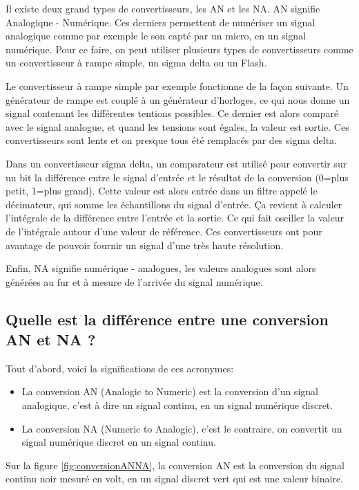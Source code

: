 \documentclass[a4paper]{article}
\begin{document}
Il existe deux grand types de convertisseurs, les AN et les NA.
AN signifie Analogique - Numérique. Ces derniers permettent de numériser un signal analogique comme par exemple le son capté par un micro, en un signal numérique. Pour ce faire, on peut utiliser plusieurs types de convertisseurs comme un convertisseur à rampe simple, un sigma delta ou un Flash.

Le convertisseur à rampe simple par exemple fonctionne de la façon suivante. Un générateur de rampe est couplé à un générateur d’horloges, ce qui nous donne un signal contenant les différentes tentions possibles. Ce dernier est alors comparé avec le signal analogue, et quand les tensions sont égales, la valeur est sortie. Ces convertisseurs sont lents et on presque tous été remplacés par des sigma delta.

Dans un convertisseur sigma delta, un comparateur est utilisé pour convertir sur un bit la différence entre le signal d'entrée et le résultat de la conversion (0=plus petit, 1=plus grand). Cette valeur est alors entrée dans un filtre appelé le décimateur, qui somme les échantillons du signal d'entrée. Ça revient à calculer l'intégrale de la différence entre l'entrée et la sortie. Ce qui fait osciller la valeur de l’intégrale autour d’une valeur de référence. Ces convertisseurs ont pour avantage de pouvoir fournir un signal d’une très haute résolution.

Enfin, NA signifie numérique - analogues, les valeurs analogues sont alors générées au fur et à mesure de l’arrivée du signal numérique.










\subsection{Quelle est la différence entre une conversion AN et NA ?}





Tout d'abord, voici la significations de ces acronymes:
\begin{itemize}
    \item La conversion AN (Analogic to Numeric) est la conversion d'un signal analogique, c'est à dire un signal continu, en un signal numérique discret.
    \item La conversion NA (Numeric to Analogic), c'est le contraire, on convertit un signal numérique discret en un signal continu.
\end{itemize}
Sur la figure \ref{fig:conversionANNA}, la conversion AN est la conversion du signal continu noir mesuré en volt, en un signal discret vert qui est une valeur binaire.
\end{document}
